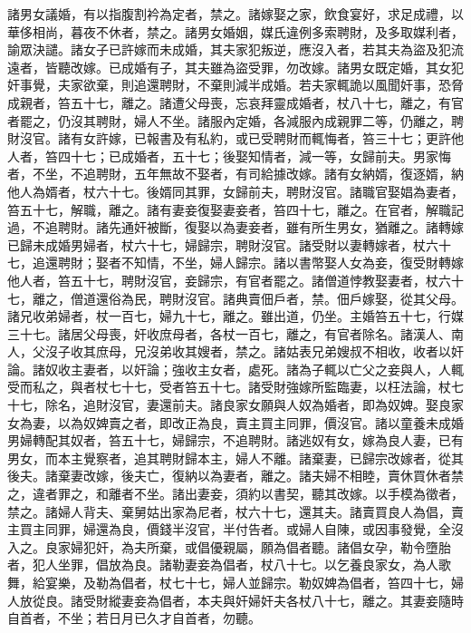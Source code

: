 \begin{pinyinscope}
 諸男女議婚，有以指腹割衿為定者，禁之。諸嫁娶之家，飲食宴好，求足成禮，以華侈相尚，暮夜不休者，禁之。諸男女婚姻，媒氏違例多索聘財，及多取媒利者，諭眾決譴。諸女子已許嫁而未成婚，其夫家犯叛逆，應沒入者，若其夫為盜及犯流遠者，皆聽改嫁。已成婚有子，其夫雖為盜受罪，勿改嫁。諸男女既定婚，其女犯奸事覺，夫家欲棄，則追還聘財，不棄則減半成婚。若夫家輒詭以風聞奸事，恐脅成親者，笞五十七，離之。諸遭父母喪，忘哀拜靈成婚者，杖八十七，離之，有官者罷之，仍沒其聘財，婦人不坐。諸服內定婚，各減服內成親罪二等，仍離之，聘財沒官。諸有女許嫁，已報書及有私約，或已受聘財而輒悔者，笞三十七；更許他人者，笞四十七；已成婚者，五十七；後娶知情者，減一等，女歸前夫。男家悔者，不坐，不追聘財，五年無故不娶者，有司給據改嫁。諸有女納婿，復逐婿，納他人為婿者，杖六十七。後婿同其罪，女歸前夫，聘財沒官。諸職官娶娼為妻者，笞五十七，解職，離之。諸有妻妾復娶妻妾者，笞四十七，離之。在官者，解職記過，不追聘財。諸先通奸被斷，復娶以為妻妾者，雖有所生男女，猶離之。諸轉嫁已歸未成婚男婦者，杖六十七，婦歸宗，聘財沒官。諸受財以妻轉嫁者，杖六十七，追還聘財；娶者不知情，不坐，婦人歸宗。諸以書幣娶人女為妾，復受財轉嫁他人者，笞五十七，聘財沒官，妾歸宗，有官者罷之。諸僧道悖教娶妻者，杖六十七，離之，僧道還俗為民，聘財沒官。諸典賣佃戶者，禁。佃戶嫁娶，從其父母。諸兄收弟婦者，杖一百七，婦九十七，離之。雖出道，仍坐。主婚笞五十七，行媒三十七。諸居父母喪，奸收庶母者，各杖一百七，離之，有官者除名。諸漢人、南人，父沒子收其庶母，兄沒弟收其嫂者，禁之。諸姑表兄弟嫂叔不相收，收者以奸論。諸奴收主妻者，以奸論；強收主女者，處死。諸為子輒以亡父之妾與人，人輒受而私之，與者杖七十七，受者笞五十七。諸受財強嫁所監臨妻，以枉法論，杖七十七，除名，追財沒官，妻還前夫。諸良家女願與人奴為婚者，即為奴婢。娶良家女為妻，以為奴婢賣之者，即改正為良，賣主買主同罪，價沒官。諸以童養未成婚男婦轉配其奴者，笞五十七，婦歸宗，不追聘財。諸逃奴有女，嫁為良人妻，已有男女，而本主覺察者，追其聘財歸本主，婦人不離。諸棄妻，已歸宗改嫁者，從其後夫。諸棄妻改嫁，後夫亡，復納以為妻者，離之。諸夫婦不相睦，賣休買休者禁之，違者罪之，和離者不坐。諸出妻妾，須約以書契，聽其改嫁。以手模為徵者，禁之。諸婦人背夫、棄舅姑出家為尼者，杖六十七，還其夫。諸賣買良人為倡，賣主買主同罪，婦還為良，價錢半沒官，半付告者。或婦人自陳，或因事發覺，全沒入之。良家婦犯奸，為夫所棄，或倡優親屬，願為倡者聽。諸倡女孕，勒令墮胎者，犯人坐罪，倡放為良。諸勒妻妾為倡者，杖八十七。以乞養良家女，為人歌舞，給宴樂，及勒為倡者，杖七十七，婦人並歸宗。勒奴婢為倡者，笞四十七，婦人放從良。諸受財縱妻妾為倡者，本夫與奸婦奸夫各杖八十七，離之。其妻妾隨時自首者，不坐；若日月已久才自首者，勿聽。



\end{pinyinscope}